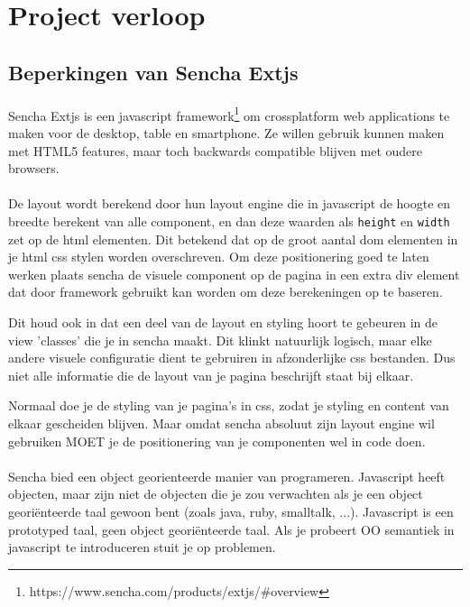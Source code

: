 \section {Project verloop}


\subsection {Beperkingen van Sencha Extjs}

\paragraph {} Sencha Extjs is een javascript
framework\footnote{https://www.sencha.com/products/extjs/\#overview} om crossplatform web
applications te maken voor de desktop, table en smartphone. Ze willen gebruik kunnen maken
met HTML5 features, maar toch backwards compatible blijven met oudere browsers.

\paragraph {} De layout wordt berekend door hun layout engine die in javascript de hoogte
en breedte berekent van alle component, en dan deze waarden als \lstinline{height} en
\lstinline{width} zet op de html elementen. Dit betekend dat op de groot aantal dom
elementen in je html css stylen worden overschreven. Om deze positionering goed te laten
werken plaats sencha de visuele component op de pagina in een extra div element dat door
framework gebruikt kan worden om deze berekeningen op te baseren.

Dit houd ook in dat een deel van de layout en styling hoort te gebeuren in de view
'classes' die je in sencha maakt. Dit klinkt natuurlijk logisch, maar elke andere visuele
configuratie dient te gebruiren in afzonderlijke css bestanden. Dus niet alle informatie
die de layout van je pagina beschrijft staat bij elkaar.

Normaal doe je de styling van je pagina's in css, zodat je styling en content van elkaar
gescheiden blijven. Maar omdat sencha absoluut zijn layout engine wil gebruiken MOET je de
positionering van je componenten wel in code doen.

\paragraph {} Sencha bied een object georienteerde manier van programeren. Javascript
heeft objecten, maar zijn niet de objecten die je zou verwachten als je een object
geori\"enteerde taal gewoon bent (zoals java, ruby, smalltalk, ...). Javascript is een
prototyped taal, geen object geori\"enteerde taal. Als je probeert OO semantiek in
javascript te introduceren stuit je op problemen.

